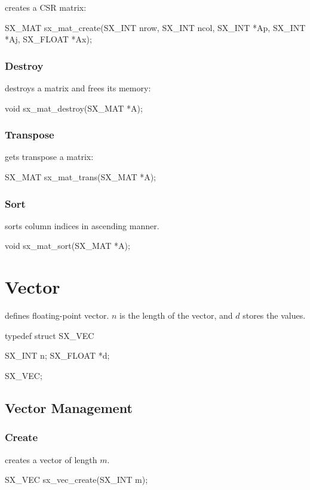  creates a CSR matrix:
\begin{evb}
SX_MAT sx_mat_create(SX_INT nrow, SX_INT ncol, SX_INT *Ap, SX_INT *Aj, SX_FLOAT *Ax);
\end{evb}

\subsubsection{Destroy}
 destroys a matrix and frees its memory:
\begin{evb}
void sx_mat_destroy(SX_MAT *A);
\end{evb}

\subsubsection{Transpose}
 gets transpose a matrix:
\begin{evb}
SX_MAT sx_mat_trans(SX_MAT *A);
\end{evb}

\subsubsection{Sort}
 sorts column indices in ascending manner.
\begin{evb}
void sx_mat_sort(SX_MAT *A);
\end{evb}

\section{Vector}

 defines floating-point vector. $n$ is the length of the vector, and $d$
stores the values.
\begin{evb}
typedef struct SX_VEC 
{
    SX_INT   n;
    SX_FLOAT *d;

} SX_VEC;
\end{evb}

\subsection{Vector Management}

\subsubsection{Create}
 creates a vector of length $m$.
\begin{evb}
SX_VEC sx_vec_create(SX_INT m);
\end{evb}

